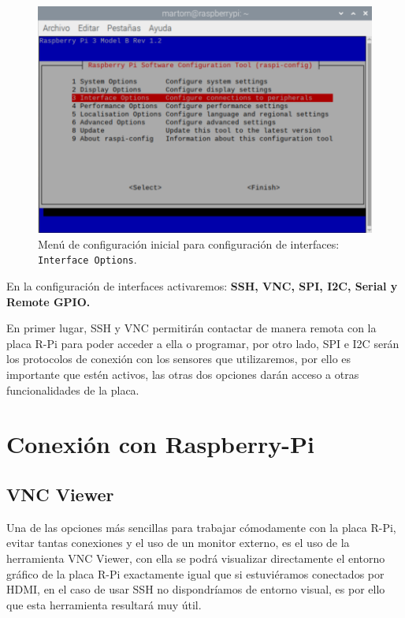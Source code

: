 \begin{figure}[tbh]
\centering
\includegraphics[scale=0.7]{images/raspiConfigInterface}
\caption[Configuración de interfaz de Raspberry-Pi]{Menú de configuración inicial para configuración de interfaces: {\protect\tt Interface Options}.}%
\label{fig:interfaceOpt}
\end{figure}

En la configuración de interfaces activaremos: \textbf{SSH, VNC, SPI, I2C, Serial y Remote GPIO.}

En primer lugar, SSH y VNC permitirán contactar de manera remota con la placa R-Pi para poder acceder a ella o programar, por otro lado, SPI e I2C serán los protocolos de conexión con los sensores que utilizaremos, por ello es importante que estén activos, las otras dos opciones darán acceso a otras funcionalidades de la placa.

\section{Conexión con Raspberry-Pi}
\subsection{VNC Viewer}

Una de las opciones más sencillas para trabajar cómodamente con la placa R-Pi, evitar tantas conexiones y el uso de un monitor externo, es el uso de la herramienta VNC Viewer, con ella se podrá visualizar directamente el entorno gráfico de la placa R-Pi exactamente igual que si estuviéramos conectados por HDMI, en el caso de usar SSH no dispondríamos de entorno visual, es por ello que esta herramienta resultará muy útil.

